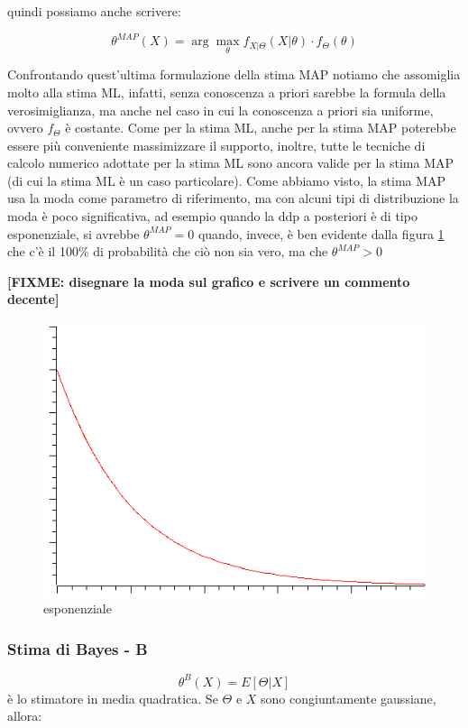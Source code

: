 quindi possiamo anche scrivere:

  \[ \theta^{MAP}(X)=\arg \max_\theta f_{X|\Theta}(X|\theta) \cdot f_\Theta(\theta) \]
  
Confrontando quest'ultima formulazione della stima MAP notiamo che assomiglia molto alla stima ML, infatti, senza conoscenza a priori sarebbe la formula della verosimiglianza, ma anche nel caso in cui la conoscenza a priori sia uniforme, ovvero $f_\Theta$ è costante.\newline
Come per la stima ML, anche per la stima MAP poterebbe essere più conveniente massimizzare il supporto, inoltre, tutte le tecniche di calcolo numerico adottate per la stima ML sono ancora valide per la stima MAP (di cui la stima ML è un caso particolare).
Come abbiamo visto, la stima MAP usa la moda come parametro di riferimento, ma con alcuni tipi di distribuzione la moda è poco significativa, ad esempio quando la ddp a posteriori è di tipo esponenziale, si avrebbe $\theta^{MAP}=0$ quando, invece, è ben evidente dalla figura \ref{fig:expMAP} che c'è il 100\% di probabilità che ciò non sia vero, ma che $\theta^{MAP}>0$

\begin{center}
\textbf{[FIXME: disegnare la moda sul grafico e scrivere un commento decente]}
\end{center}
\begin{figure}[htbp]
  \centering
  \includegraphics[scale=0.5]{img/exp.png}
  \caption{esponenziale\label{fig:expMAP}}
\end{figure}


\subsubsection{Stima di Bayes - B} %
  \[ \theta^B(X)=E[\Theta|X] \]
è lo stimatore in media quadratica. Se $\Theta$ e $X$ sono congiuntamente gaussiane, allora:

